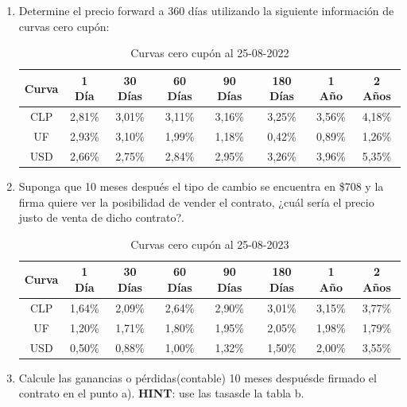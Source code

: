 \documentclass[12pt]{article}
\begin{document}
\begin{enumerate}[label=\textbf{\alph*)}]
\item Determine el precio forward a 360 días utilizando la siguiente información de curvas cero cupón:
\begin{table}[h!]
    \centering
    \caption{Curvas cero cupón al 25-08-2022}
    \begin{tabular}{|c|c|c|c|c|c|c|c|}
    \hline
    \textbf{Curva} & \textbf{1 Día} & \textbf{30 Días} & \textbf{60 Días} & \textbf{90 Días} & \textbf{180 Días} & \textbf{1 Año} & \textbf{2 Años} \\
    \hline
    CLP & 2{,}81\% & 3{,}01\% & 3{,}11\% & 3{,}16\% & 3{,}25\% & 3{,}56\% & 4{,}18\% \\
    UF  & 2{,}93\% & 3{,}10\% & 1{,}99\% & 1{,}18\% & 0{,}42\% & 0{,}89\% & 1{,}26\% \\
    USD & 2{,}66\% & 2{,}75\% & 2{,}84\% & 2{,}95\% & 3{,}26\% & 3{,}96\% & 5{,}35\% \\
    \hline
    \end{tabular}
\end{table}
\item	Suponga que 10 meses después el tipo de cambio se encuentra en \$708 y la firma quiere ver
la posibilidad de vender el contrato, ¿cuál sería el precio justo de venta de dicho contrato?.
\begin{table}[h!]
    \centering
    \caption{Curvas cero cupón al 25-08-2023}
    \begin{tabular}{|c|c|c|c|c|c|c|c|}
    \hline
    \textbf{Curva} & \textbf{1 Día} & \textbf{30 Días} & \textbf{60 Días} & \textbf{90 Días} & \textbf{180 Días} & \textbf{1 Año} & \textbf{2 Años} \\
    \hline
    CLP & 1{,}64\% & 2{,}09\% & 2{,}64\% & 2{,}90\% & 3{,}01\% & 3{,}15\% & 3{,}77\% \\
    UF  & 1{,}20\% & 1{,}71\% & 1{,}80\% & 1{,}95\% & 2{,}05\% & 1{,}98\% & 1{,}79\% \\
    USD & 0{,}50\% & 0{,}88\% & 1{,}00\% & 1{,}32\% & 1{,}50\% & 2{,}00\% & 3{,}55\% \\
    \hline
    \end{tabular}
\end{table}
\item Calcule las ganancias o pérdidas(contable) 10 meses despuésde firmado el contrato en el 
    punto a). \textbf{HINT}: use las tasasde la tabla b.
\end{enumerate}
\end{document}
